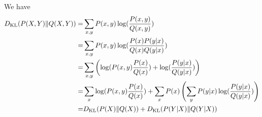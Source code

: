 \begin{answer}
    We have
\begin{align*}
D_{\text{KL}}(P(X,Y)\|Q(X,Y)) =& \sum_{x,y}^{}P(x,y)\log(\frac{P(x,y)}{Q(x,y)})\\
= &\sum_{x,y}^{}P(x,y)\log(\frac{P(x)P(y|x)}{Q(x)Q(y|x)})\\
= &\sum_{x,y}^{}\left( \log(P(x,y)\frac{P(x)}{Q(x)}) + \log( \frac{P(y|x)}{Q(y|x)})\right) \\
= &\sum_{x}^{}\log(P(x,y)\frac{P(x)}{Q(x)})+\sum_{x}^{}P(x)\left( \sum_{y}^{}P(y|x)\log( \frac{P(y|x)}{Q(y|x)})\right) \\
= &D_{\text{KL}}(P(X)\|Q(X)) + D_{\text{KL}}(P(Y|X)\|Q(Y|X))
\end{align*}
\end{answer}
